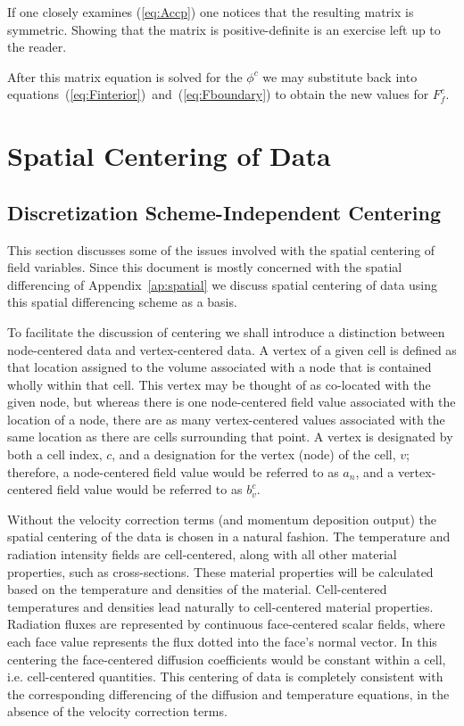 \documentclass{article}
\begin{document}
If one closely examines (\ref{eq:Accp}) one notices that the resulting
matrix is symmetric.  Showing that the matrix is positive-definite is
an exercise left up to the reader.

After this matrix equation is solved for the $\phi^{c}$ we may substitute
back into equations~(\ref{eq:Finterior})~and~(\ref{eq:Fboundary})
to obtain the new values for $F^{c}_{f}$.

\section{Spatial Centering of Data}

\subsection{Discretization Scheme-Independent Centering}

This section discusses some of the issues involved with the spatial
centering of field variables.
Since this document is mostly concerned with the spatial differencing of
Appendix~\ref{ap:spatial} we discuss spatial centering of data using
this spatial differencing scheme as a basis.

To facilitate the discussion of centering we shall introduce a distinction
between node-centered data and vertex-centered data.
A vertex of a given cell
is defined as that location assigned to the volume associated with
a node that is contained wholly within that cell.
This vertex may be thought of as co-located with the given node, but
whereas there is one node-centered field
value associated with the location of a node, there are as
many vertex-centered values associated with the same location as
there are cells surrounding that point.
A vertex is designated by both a cell index, $c$, and a designation
for the vertex (node) of the cell, $v$; therefore, a node-centered field value
would be referred to as $a_{n}$, and a vertex-centered field value
would be referred to as $b^{c}_{v}$.

Without the velocity correction terms (and momentum deposition output)
the spatial centering of the data is chosen in a natural fashion.
The temperature and radiation intensity fields are cell-centered,
along with all other material properties, such as cross-sections.
These material properties will be calculated based on the temperature
and densities of the material.
Cell-centered temperatures and densities lead naturally to cell-centered
material properties.
Radiation fluxes are represented by continuous face-centered scalar fields,
where each face value represents the flux dotted into the face's normal
vector.
In this centering the face-centered diffusion coefficients would be constant
within a cell, i.e. cell-centered quantities.
This centering of data is completely consistent with the
corresponding differencing of the diffusion and temperature equations,
in the absence of the velocity correction terms.
\end{document}
